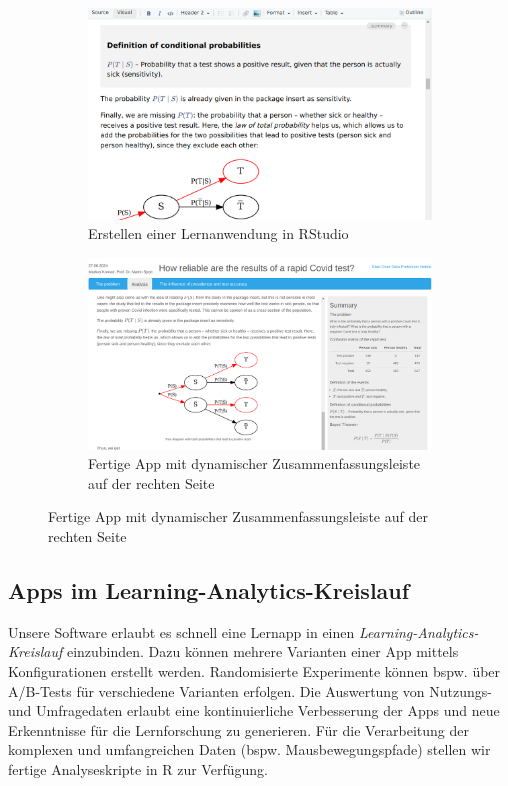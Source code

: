 \documentclass[a0,portrait]{a0poster}
\begin{document}
\begin{multicols}{2}
\vspace{1cm}

\begin{figure}[H]
\hfill
\begin{subfigure}[h]{0.49\linewidth}
\includegraphics[width=\linewidth]{at-visual-smaller}
\caption*{\footnotesize Erstellen einer Lernanwendung in RStudio}
\end{subfigure}
\hfill
\begin{subfigure}[h]{0.49\linewidth}
\includegraphics[width=\linewidth]{app-summary}
\caption*{\footnotesize Fertige App mit dynamischer Zusammenfassungsleiste auf der rechten Seite}
\end{subfigure}
\hfill
\end{figure}

\subsection*{Apps im Learning-Analytics-Kreislauf}

Unsere Software erlaubt es schnell eine Lernapp in einen \textit{Learning-Analytics-Kreislauf} einzubinden. Dazu können mehrere Varianten einer App mittels Konfigurationen erstellt werden. Randomisierte Experimente können bspw. über A/B-Tests für verschiedene Varianten erfolgen. Die Auswertung von Nutzungs- und Umfragedaten erlaubt eine kontinuierliche Verbesserung der Apps und neue Erkenntnisse für die Lernforschung zu generieren. Für die Verarbeitung der komplexen und umfangreichen Daten (bspw. Mausbewegungspfade) stellen wir fertige Analyseskripte in R zur Verfügung.


\end{multicols}
\end{document}
